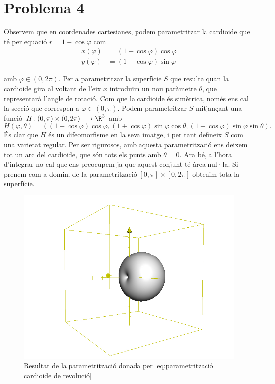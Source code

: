 \section*{Problema 4} \label{sec:problema 4} 
Observem que en coordenades cartesianes, podem parametritzar la cardioide que té per equació \( r = 1 + \cos{\varphi} \) com
\begin{equation}
  \begin{aligned}
    x(\varphi) &= (1 + \cos{\varphi})\cos{\varphi} \\
    y(\varphi) &= (1 + \cos{\varphi})\sin{\varphi}
  \end{aligned}
	\label{eq:parametrització cardioide de revolució}
\end{equation}

amb \( \varphi \in (0, 2\pi) \). Per a parametritzar la superfície \( S \) que resulta quan la cardioide gira al voltant de l'eix \( x \) introduïm un nou paràmetre \( \theta \), que representarà l'angle de rotació. Com que la cardioide és simètrica, només ens cal la secció que correspon a \( \varphi \in (0, \pi) \). Podem parametritzar \( S \) mitjançant una funció \( H\colon (0,\pi) \times (0,2\pi) \longrightarrow \R^3 \) amb 
\begin{equation}
  H(\varphi,\theta) = ((1+\cos{\varphi})\cos{\varphi}, (1+\cos{\varphi})\sin{\varphi}\cos{\theta}, (1+\cos{\varphi})\sin{\varphi}\sin{\theta}). \label{eq:cardioide de revolució}
\end{equation}
És clar que \( H \) és un difeomorfisme en la seva imatge, i per tant defineix \( S \) com una varietat regular. Per ser rigurosos, amb aquesta parametrització ens deixem tot un arc del cardioide, que són tots els punts amb \( \theta = 0 \). Ara bé, a l'hora d'integrar no cal que ens preocupem ja que aquest conjunt té àrea nul·la. Si prenem com a domini de la parametrització \( [0,\pi] \times [0,2\pi] \)	obtenim tota la superfície.

\begin{figure}[htb]
  \centering
  \includegraphics[scale = 0.4]{cardioide.jpg}
 	\caption{Resultat de la parametrització donada per \ref{eq:parametrització cardioide de revolució}} 
\end{figure}

